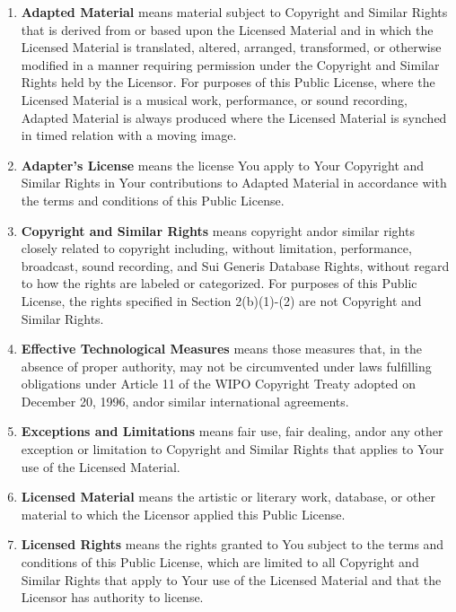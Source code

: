 \begin{enumerate}[label=\alph*.]
  \item \textbf{Adapted Material} means material subject to Copyright and Similar Rights that is derived from or based upon the Licensed Material and in which the Licensed Material is translated, altered, arranged, transformed, or otherwise modified in a manner requiring permission under the Copyright and Similar Rights held by the Licensor. For purposes of this Public License, where the Licensed Material is a musical work, performance, or sound recording, Adapted Material is always produced where the Licensed Material is synched in timed relation with a moving image.

  \item \textbf{Adapter's License} means the license You apply to Your Copyright and Similar Rights in Your contributions to Adapted Material in accordance with the terms and conditions of this Public License.

  \item \textbf{Copyright and Similar Rights} means copyright and\myslash or similar rights closely related to copyright including, without limitation, performance, broadcast, sound recording, and Sui Generis Database Rights, without regard to how the rights are labeled or categorized. For purposes of this Public License, the rights specified in Section 2(b)(1)-(2) are not Copyright and Similar Rights.

  \item \textbf{Effective Technological Measures} means those measures that, in the absence of proper authority, may not be circumvented under laws fulfilling obligations under Article 11 of the WIPO Copyright Treaty adopted on December 20, 1996, and\myslash or similar international agreements.

  \item \textbf{Exceptions and Limitations} means fair use, fair dealing, and\myslash or any other exception or limitation to Copyright and Similar Rights that applies to Your use of the Licensed Material.

  \item \textbf{Licensed Material} means the artistic or literary work, database, or other material to which the Licensor applied this Public License.

  \item \textbf{Licensed Rights} means the rights granted to You subject to the terms and conditions of this Public License, which are limited to all Copyright and Similar Rights that apply to Your use of the Licensed Material and that the Licensor has authority to license.


\end{enumerate}
